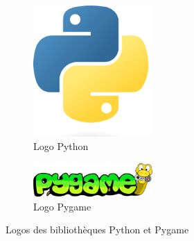 \documentclass[12pt]{article}
\begin{document}
\begin{figure}[!h]
  \centering
  \begin{subfigure}[b]{0.2\textwidth}
    \centering
    \includegraphics[width=0.5\textwidth]{assets/python_logo.png}
    \caption{Logo Python}
    \label{logopython}
  \end{subfigure}
  \hspace{0.6cm}
  \begin{subfigure}[b]{0.2\textwidth}
    \centering
    \includegraphics[width=0.5\textwidth]{assets/pygame_logo.png}
    \caption{Logo Pygame}
    \label{pygame}
  \end{subfigure}
  \caption{Logos des bibliothèques Python et Pygame}
  \label{fig:logos_python}
\end{figure}
\end{document}
